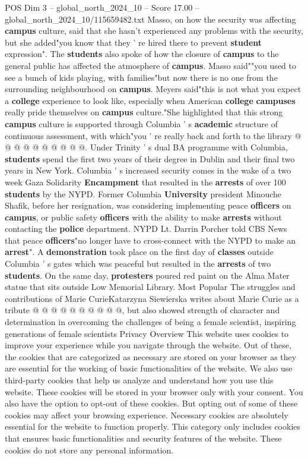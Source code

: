 \begin{textsample}{POS Dim 3 – global\_north\_2024\_10 – Score 17.00 – global\_north\_2024\_10/115659482.txt}
Masso, on how the security was affecting \textbf{campus} culture, said that she hasn't experienced any problems with the security, but she added"you know that they ' re hired there to prevent \textbf{student} expression".
The \textbf{students} also spoke of how the closure of \textbf{campus} to the general public has affected the atmosphere of \textbf{campus}.
Masso said""you used to see a bunch of kids playing, with families"but now there is no one from the surrounding neighbourhood on \textbf{campus}.
Meyers said"this is not what you expect a \textbf{college} experience to look like, especially when American \textbf{college} \textbf{campuses} really pride themselves on \textbf{campus} culture."She highlighted that this strong \textbf{campus} culture is supported through Columbia ' s \textbf{academic} structure of continuous assessment, with which"you ' re really back and forth to the library @ @ @ @ @ @ @ @ @ @.
Under Trinity ' s dual BA programme with Columbia, \textbf{students} spend the first two years of their degree in Dublin and their final two years in New York.
Columbia ' s increased security comes in the wake of a two week Gaza Solidarity \textbf{Encampment} that resulted in the \textbf{arrests} of over 100 \textbf{students} by the NYPD.
Former Columbia \textbf{University} president Minouche Shafik, before her resignation, was considering implementing peace \textbf{officers} on \textbf{campus}, or public safety \textbf{officers} with the ability to make \textbf{arrests} without contacting the \textbf{police} department.
NYPD Lt.
Darrin Porcher told CBS News that peace \textbf{officers}"no longer have to cross-connect with the NYPD to make an \textbf{arrest}".
A \textbf{demonstration} took place on the first day of \textbf{classes} outside Columbia ' s gates which was peaceful but resulted in the \textbf{arrests} of two \textbf{students}.
On the same day, \textbf{protesters} poured red paint on the Alma Mater statue that sits outside Low Memorial Library.
Most Popular The struggles and contributions of Marie CurieKatarzyna Siewierska writes about Marie Curie as a tribute @ @ @ @ @ @ @ @ @ @, but also showed strength of character and determination in overcoming the challenges of being a female scientist, inspiring generations of female scientists Privacy Overview This website uses cookies to improve your experience while you navigate through the website.
Out of these, the cookies that are categorized as necessary are stored on your browser as they are essential for the working of basic functionalities of the website.
We also use third-party cookies that help us analyze and understand how you use this website.
These cookies will be stored in your browser only with your consent.
You also have the option to opt-out of these cookies.
But opting out of some of these cookies may affect your browsing experience.
Necessary cookies are absolutely essential for the website to function properly.
This category only includes cookies that ensures basic functionalities and security features of the website.
These cookies do not store any personal information.


\end{textsample}
